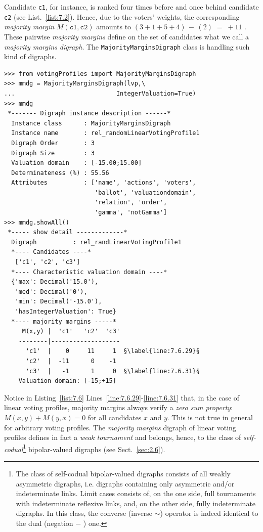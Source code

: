 Candidate \texttt{c1}, for instance, is ranked four times before and once behind candidate \texttt{c2} (see List.~\vref{list:7.2}). Hence, due to the voters' weights, the corresponding \emph{majority margin} $M(\mathtt{c1},\mathtt{c2})$ amounts to  $(3+1+5+4)\, -\,(2)\; =\; +11$ . These pairwise \emph{majority margins} define on the set of candidates what we call a \emph{majority margins digraph}. The \texttt{MajorityMarginsDigraph} class is handling such kind of digraphs.
\begin{lstlisting}[caption={Example of \emph{Majority Margins} digraph},label=list:7.6]
>>> from votingProfiles import MajorityMarginsDigraph
>>> mmdg = MajorityMarginsDigraph(lvp,\
...                            IntegerValuation=True)
>>> mmdg
 *------- Digraph instance description ------*
  Instance class      : MajorityMarginsDigraph
  Instance name       : rel_randomLinearVotingProfile1
  Digraph Order       : 3
  Digraph Size        : 3
  Valuation domain    : [-15.00;15.00]
  Determinateness (%) : 55.56
  Attributes          : ['name', 'actions', 'voters',
                         'ballot', 'valuationdomain',
                         'relation', 'order',
                         'gamma', 'notGamma']
>>> mmdg.showAll()
 *----- show detail -------------*
  Digraph          : rel_randLinearVotingProfile1
  *---- Candidates ----*
   ['c1', 'c2', 'c3']
  *---- Characteristic valuation domain ----*
  {'max': Decimal('15.0'),
   'med': Decimal('0'),
   'min': Decimal('-15.0'),
   'hasIntegerValuation': True}
  *---- majority margins -----*
     M(x,y) |  'c1'   'c2'  'c3'	  
    --------|-------------------
      'c1'  |    0     11     1	 §\label{line:7.6.29}§
      'c2'  |  -11      0    -1	 
      'c3'  |   -1      1     0	 §\label{line:7.6.31}§
    Valuation domain: [-15;+15]
\end{lstlisting}

Notice in Listing~\ref{list:7.6} Lines~\ref{line:7.6.29}-\ref{line:7.6.31} that, in the case of linear voting profiles, majority margins always verify a \emph{zero sum property}: $M(x,y) + M(y,x) = 0$ for all candidates $x$ and $y$. This is not true in general for arbitrary voting profiles. The \emph{majority margins} digraph of linear voting profiles defines in fact a \emph{weak tournament} and belongs, hence, to the class of \emph{self-codual}\footnote{The class of self-codual bipolar-valued digraphs consists of all weakly asymmetric digraphs, i.e. digraphs containing only asymmetric and/or indeterminate links. Limit cases consists of, on the one side, full tournaments with indeterminate reflexive links, and, on the other side, fully indeterminate digraphs. In this class, the converse (inverse $\sim$) operator is indeed identical to the dual (negation $-$ ) one.} bipolar-valued digraphs (see Sect.~\ref{sec:2.6}).
    
